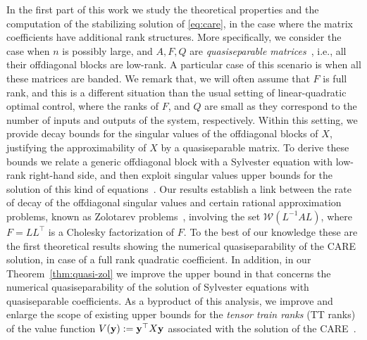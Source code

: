 \documentclass[a4paper,10pt]{article}
\newcommand{\upd}[1]{{\color{black}#1}} %
\begin{document}
In the first part of this work we  study the theoretical properties and the computation of the stabilizing solution of \eqref{eq:care}, in the case where the matrix coefficients have additional rank structures. More specifically, we consider the case when $n$ is possibly large, and $A,F,Q$ are \emph{quasiseparable matrices}~\cite{vandebril08}, i.e., all their offdiagonal blocks are low-rank. A particular case of this scenario is when all these matrices are banded. We remark that, we will often assume that $F$ is full rank, and this is a different situation than the usual setting of linear-quadratic optimal control, where the ranks of $F$, and $Q$ are small as they correspond to the number of inputs and outputs of the system, respectively. Within this setting, we provide decay bounds for the singular values of the offdiagonal blocks of $X$, justifying the approximability of $X$ by a quasiseparable matrix. To derive these bounds we relate a generic offdiagonal block with a Sylvester equation with low-rank right-hand side, and then exploit singular values upper bounds for the solution of this kind of equations~\cite{beckermann17}. Our results establish a link between the rate of decay of the offdiagonal singular values and certain rational approximation \upd{problems}, known as Zolotarev problems~\cite{beckermann17}, involving the set $\mathcal W(L^{-1}AL)$, where $F=LL^\top$ is a Cholesky factorization of $F$. To the best of our knowledge these are the first theoretical results showing the numerical quasiseparability of the CARE solution, in case of a full rank quadratic coefficient. In addition, in our Theorem~\ref{thm:quasi-zol} we improve the upper bound in \cite[Theorem 2.7]{massei18} that concerns the numerical quasiseparability of the solution of Sylvester equations with quasiseparable coefficients. As a byproduct of this analysis, we improve and enlarge the scope of existing upper bounds for the \emph{tensor train ranks} (TT ranks) of the value function $V(\mathbf y):=\mathbf y^\upd{\top} X\mathbf y$ associated with the solution of the CARE~\cite[Theorem 3.1]{dolgov21}. 
\end{document}
